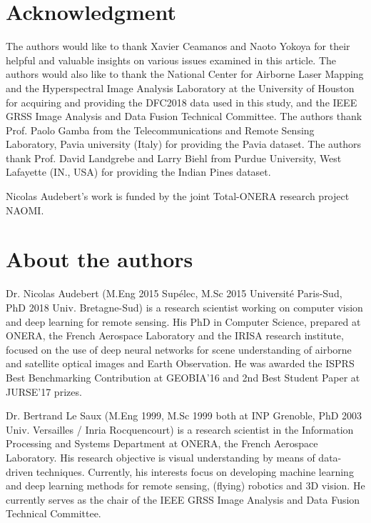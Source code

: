 \documentclass[journal]{IEEEtran}
\begin{document}
\section*{Acknowledgment}

The authors would like to thank Xavier Ceamanos and Naoto Yokoya for their helpful and valuable insights on various issues examined in this article. The authors would also like to thank the National Center for Airborne Laser Mapping and the Hyperspectral Image Analysis Laboratory at the University of Houston for acquiring and providing the DFC2018 data used in this study, and the IEEE GRSS Image Analysis and Data Fusion Technical Committee. The authors thank Prof. Paolo Gamba from the Telecommunications and Remote Sensing Laboratory, Pavia university (Italy) for providing the Pavia dataset. The authors thank Prof. David Landgrebe and Larry Biehl from  Purdue University, West Lafayette (IN., USA) for providing the Indian Pines dataset. 

Nicolas Audebert's work is funded by the joint Total-ONERA research project NAOMI.



\ifCLASSOPTIONcaptionsoff
  \newpage
\fi
















\appendix

\section*{About the authors}

Dr. Nicolas Audebert (M.Eng 2015 Supélec, M.Sc 2015 Université Paris-Sud, PhD 2018 Univ. Bretagne-Sud) is a research scientist working on computer vision and deep learning for remote sensing. His PhD in Computer Science, prepared at ONERA, the French Aerospace Laboratory and the IRISA research institute, focused on the use of deep neural networks for scene understanding of airborne and satellite optical images and Earth Observation. He was awarded the ISPRS Best Benchmarking Contribution at GEOBIA'16 and 2nd Best Student Paper at JURSE'17 prizes.

Dr. Bertrand Le Saux (M.Eng 1999, M.Sc 1999 both at INP Grenoble, PhD 2003 Univ. Versailles / Inria Rocquencourt) is a research scientist in the Information Processing and Systems Department at ONERA, the French Aerospace Laboratory. His research objective is visual understanding by means of data-driven techniques. Currently, his interests focus on developing machine learning and deep learning methods for remote sensing, (flying) robotics and 3D vision. He currently serves as the chair of the IEEE GRSS Image Analysis and Data Fusion Technical Committee.
\end{document}
